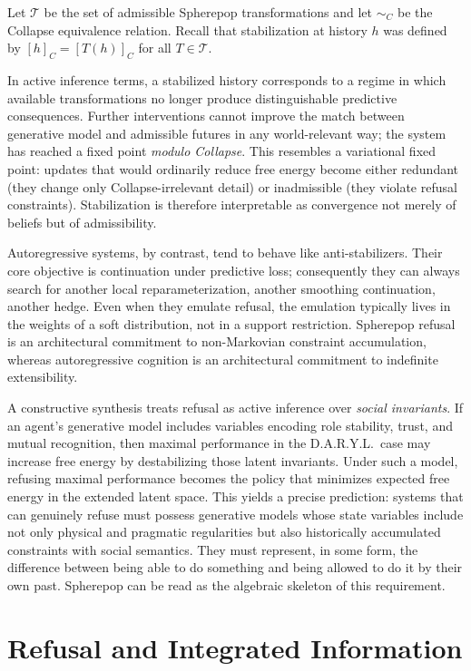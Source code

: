 \documentclass[11pt]{article}
\begin{document}
Let $\mathcal{T}$ be the set of admissible Spherepop transformations and let
$\sim_C$ be the Collapse equivalence relation. Recall that stabilization at
history $h$ was defined by $[h]_C = [T(h)]_C$ for all $T\in \mathcal{T}$.

In active inference terms, a stabilized history corresponds to a regime in which
available transformations no longer produce distinguishable predictive
consequences. Further interventions cannot improve the match between generative
model and admissible futures in any world-relevant way; the system has reached a
fixed point \emph{modulo Collapse}. This resembles a variational fixed point:
updates that would ordinarily reduce free energy become either redundant (they
change only Collapse-irrelevant detail) or inadmissible (they violate refusal
constraints). Stabilization is therefore interpretable as convergence not merely
of beliefs but of admissibility.

Autoregressive systems, by contrast, tend to behave like anti-stabilizers. Their
core objective is continuation under predictive loss; consequently they can
always search for another local reparameterization, another smoothing
continuation, another hedge. Even when they emulate refusal, the emulation
typically lives in the weights of a soft distribution, not in a support
restriction. Spherepop refusal is an architectural commitment to
non-Markovian constraint accumulation, whereas autoregressive cognition is an
architectural commitment to indefinite extensibility.

A constructive synthesis treats refusal as active inference over
\emph{social invariants}. If an agent's generative model includes variables
encoding role stability, trust, and mutual recognition, then maximal performance
in the D.A.R.Y.L.\ case may increase free energy by destabilizing those latent
invariants. Under such a model, refusing maximal performance becomes the policy
that minimizes expected free energy in the extended latent space. This yields a
precise prediction: systems that can genuinely refuse must possess generative
models whose state variables include not only physical and pragmatic regularities
but also historically accumulated constraints with social semantics. They must
represent, in some form, the difference between being able to do something and
being allowed to do it by their own past. Spherepop can be read as the algebraic
skeleton of this requirement.

\section{Refusal and Integrated Information}
\label{sec:iit}
\end{document}
